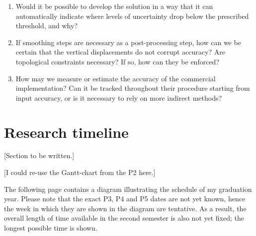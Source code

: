 \begin{enumerate}
\begin{enumerate}
        \item Would it be possible to develop the solution in a way that it can automatically indicate where levels of uncertainty drop below the prescribed threshold, and why?
        \item If smoothing steps are necessary as a post-processing step, how can we be certain that the vertical displacements do not corrupt accuracy? Are topological constraints necessary? If so, how can they be enforced?
        \item How may we measure or estimate the accuracy of the commercial implementation? Can it be tracked throughout their procedure starting from input accuracy, or is it necessary to rely on more indirect methods?
    \end{enumerate}
\end{enumerate}

\section{Research timeline}
\label{sec:rq}

[Section to be written.]

[I could re-use the Gantt-chart from the P2 here.]

The following page contains a diagram illustrating the schedule of my graduation year. Please note that the exact P3, P4 and P5 dates are not yet known, hence the week in which they are shown in the diagram are tentative. As a result, the overall length of time available in the second semester is also not yet fixed; the longest possible time is shown.

